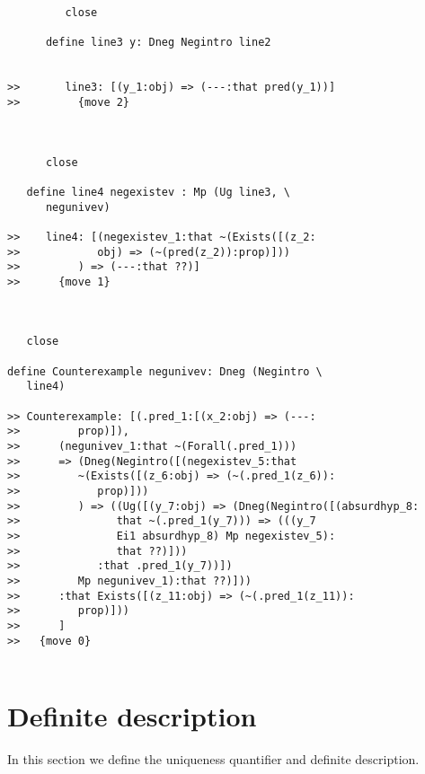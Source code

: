 \documentclass[12pt]{article}
\begin{document}
\begin{verbatim}
         close

      define line3 y: Dneg Negintro line2


>>       line3: [(y_1:obj) => (---:that pred(y_1))]
>>         {move 2}



      close

   define line4 negexistev : Mp (Ug line3, \
      negunivev)

>>    line4: [(negexistev_1:that ~(Exists([(z_2:
>>            obj) => (~(pred(z_2)):prop)]))
>>         ) => (---:that ??)]
>>      {move 1}



   close

define Counterexample negunivev: Dneg (Negintro \
   line4)

>> Counterexample: [(.pred_1:[(x_2:obj) => (---:
>>         prop)]),
>>      (negunivev_1:that ~(Forall(.pred_1)))
>>      => (Dneg(Negintro([(negexistev_5:that
>>         ~(Exists([(z_6:obj) => (~(.pred_1(z_6)):
>>            prop)]))
>>         ) => ((Ug([(y_7:obj) => (Dneg(Negintro([(absurdhyp_8:
>>               that ~(.pred_1(y_7))) => (((y_7
>>               Ei1 absurdhyp_8) Mp negexistev_5):
>>               that ??)]))
>>            :that .pred_1(y_7))])
>>         Mp negunivev_1):that ??)]))
>>      :that Exists([(z_11:obj) => (~(.pred_1(z_11)):
>>         prop)]))
>>      ]
>>   {move 0}


\end{verbatim}





\section{Definite description}

In this section we define the uniqueness quantifier and definite description.
\end{document}
